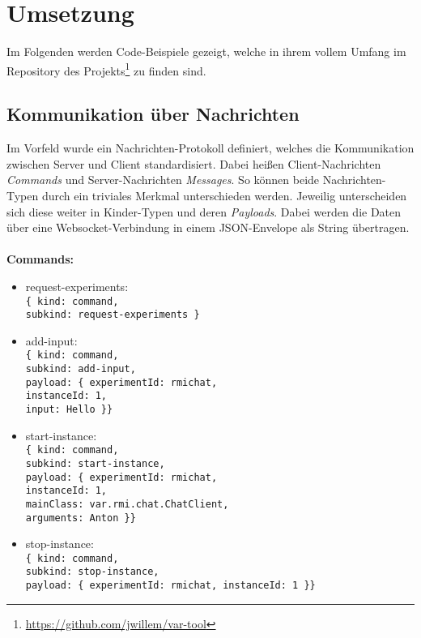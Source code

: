 \section{Umsetzung}
Im Folgenden werden Code-Beispiele gezeigt, welche in ihrem vollem Umfang im Repository des Projekts\footnote{\url{https://github.com/jwillem/var-tool}} zu finden sind.
\subsection{Kommunikation über Nachrichten}
Im Vorfeld wurde ein Nachrichten-Protokoll definiert, welches die Kommunikation zwischen Server und Client standardisiert.
Dabei heißen Client-Nachrichten \textit{Commands} und Server-Nachrichten \textit{Messages}.
So können beide Nachrichten-Typen durch ein triviales Merkmal unterschieden werden.
Jeweilig unterscheiden sich diese weiter in Kinder-Typen und deren \textit{Payloads}.
Dabei werden die Daten über eine Websocket-Verbindung in einem JSON-Envelope als String übertragen.
\\\\
\textbf{Commands:}
\begin{itemize}
  \item request-experiments:
    \\\texttt{\{ kind: command, \\subkind: request-experiments \}}
  \item add-input:
    \\\texttt{\{ kind: command, \\subkind: add-input,
    \\ payload: \{ experimentId: rmichat, \\\hspace*{1.8cm}instanceId: 1, \\\hspace*{1.8cm}input: Hello \}\}}
  \item start-instance:
    \\\texttt{\{ kind: command, \\ subkind: start-instance,
    \\ payload: \{ experimentId: rmichat, \\\hspace*{1.8cm}instanceId: 1, \\\hspace*{1.8cm}mainClass: var.rmi.chat.ChatClient, \\\hspace*{1.8cm}arguments: Anton \}\}}
  \item stop-instance:
    \\\texttt{\{ kind: command, \\ subkind: stop-instance,
    \\ payload: \{ experimentId: rmichat, instanceId: 1 \}\}}
\end{itemize}
